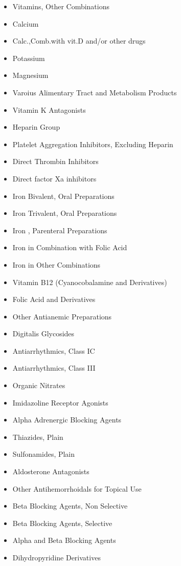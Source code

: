 \documentclass[a4paper,12pt]{article}
\begin{document}
\begin{appendices}
\begin{itemize}
   			\item Vitamins, Other Combinations
   			\item Calcium
   			\item Calc.,Comb.with vit.D and/or other drugs
   			\item Potassium
   			\item Magnesium
   			\item Varoius Alimentary Tract and Metabolism Products
   			\item Vitamin K Antagonists
   			\item Heparin Group
   			\item Platelet Aggregation Inhibitors, Excluding Heparin
   			\item Direct Thrombin Inhibitors
   			\item Direct factor Xa inhibitors
   			\item Iron Bivalent, Oral Preparations
   			\item Iron Trivalent, Oral Preparations
   			\item Iron , Parenteral Preparations
   			\item Iron in Combination with Folic Acid
   			\item Iron in Other Combinations
   			\item Vitamin B12 (Cyanocobalamine and Derivatives)
   			\item Folic Acid and Derivatives
   			\item Other Antianemic Preparations
   			\item Digitalis Glycosides
   			\item Antiarrhythmics, Class IC
   			\item Antiarrhythmics, Class III
   			\item Organic Nitrates
   			\item Imidazoline Receptor Agonists
   			\item Alpha Adrenergic Blocking Agents
   			\item Thiazides, Plain
   			\item Sulfonamides, Plain
   			\item Aldosterone Antagonists
   			\item Other Antihemorrhoidals for Topical Use
   			\item Beta Blocking Agents, Non Selective
   			\item Beta Blocking Agents, Selective
   			\item Alpha and Beta Blocking Agents
   			\item Dihydropyridine Derivatives

\end{itemize}
\end{appendices}
\end{document}
